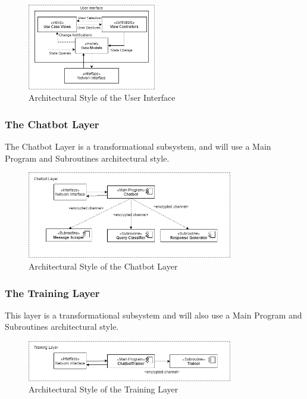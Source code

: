 \documentclass[11pt]{article}
\begin{document}
\begin{figure}[H]
	\centering
	\includegraphics[width=0.5\textwidth]{../../images/User_Interface_MVC.png}
	\caption{Architectural Style of the User Interface}
\end{figure}

\subsubsection{The Chatbot Layer}
The Chatbot Layer is a transformational subsystem, and will use a Main Program and Subroutines architectural style.

\begin{figure}[H]
	\centering
	\includegraphics[width=0.8\textwidth]{../../images/Chatbot_Layer_Architecture.png}
	\caption{Architectural Style of the Chatbot Layer}
\end{figure}

\subsubsection{The Training Layer}
This layer is a transformational subsystem and will also use a Main Program and Subroutines architectural style.

\begin{figure}[H]
	\centering
	\includegraphics[width=0.8\textwidth]{../../images/Training_Layer_Architecture.png}
	\caption{Architectural Style of the Training Layer}
\end{figure}
\end{document}
